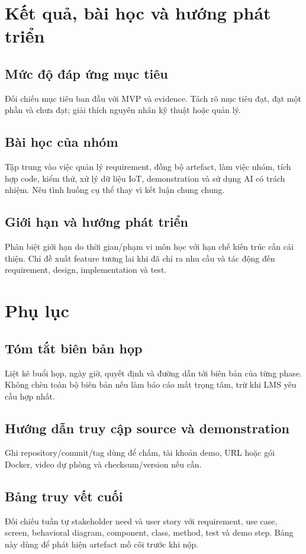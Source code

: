 \section{Kết quả, bài học và hướng phát triển}

\subsection{Mức độ đáp ứng mục tiêu}

Đối chiếu mục tiêu ban đầu với MVP và evidence. Tách rõ mục tiêu đạt, đạt một phần và chưa đạt; giải thích nguyên nhân kỹ thuật hoặc quản lý.

\subsection{Bài học của nhóm}

Tập trung vào việc quản lý requirement, đồng bộ artefact, làm việc nhóm, tích hợp code, kiểm thử, xử lý dữ liệu IoT, demonstration và sử dụng AI có trách nhiệm. Nêu tình huống cụ thể thay vì kết luận chung chung.

\subsection{Giới hạn và hướng phát triển}

Phân biệt giới hạn do thời gian/phạm vi môn học với hạn chế kiến trúc cần cải thiện. Chỉ đề xuất feature tương lai khi đã chỉ ra nhu cầu và tác động đến requirement, design, implementation và test.

\section{Phụ lục}

\subsection{Tóm tắt biên bản họp}
Liệt kê buổi họp, ngày giờ, quyết định và đường dẫn tới biên bản của từng phase. Không chèn toàn bộ biên bản nếu làm báo cáo mất trọng tâm, trừ khi LMS yêu cầu hợp nhất.

\subsection{Hướng dẫn truy cập source và demonstration}
Ghi repository/commit/tag dùng để chấm, tài khoản demo, URL hoặc gói Docker, video dự phòng và checksum/version nếu cần.

\subsection{Bảng truy vết cuối}
Đối chiếu tuần tự stakeholder need và user story với requirement, use case, screen, behavioral diagram, component, class, method, test và demo step. Bảng này dùng để phát hiện artefact mồ côi trước khi nộp.
